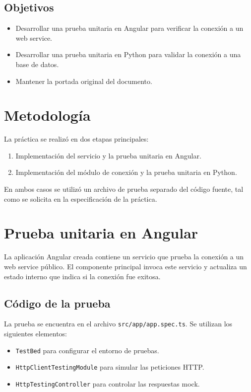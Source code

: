\documentclass[12pt]{article}
\begin{document}
\subsection{Objetivos}
\begin{itemize}
    \item Desarrollar una prueba unitaria en Angular para verificar la conexión a un web service.
    \item Desarrollar una prueba unitaria en Python para validar la conexión a una base de datos.
    \item Mantener la portada original del documento.
\end{itemize}

\section{Metodología}
La práctica se realizó en dos etapas principales:
\begin{enumerate}
    \item Implementación del servicio y la prueba unitaria en Angular.
    \item Implementación del módulo de conexión y la prueba unitaria en Python.
\end{enumerate}
En ambos casos se utilizó un archivo de prueba separado del código fuente, tal como se solicita en la especificación de la práctica.

\section{Prueba unitaria en Angular}
La aplicación Angular creada contiene un servicio que prueba la conexión a un web service público. El componente principal invoca este servicio y actualiza un estado interno que indica si la conexión fue exitosa.

\subsection{Código de la prueba}
La prueba se encuentra en el archivo \texttt{src/app/app.spec.ts}. Se utilizan los siguientes elementos:
\begin{itemize}
    \item \texttt{TestBed} para configurar el entorno de pruebas.
    \item \texttt{HttpClientTestingModule} para simular las peticiones HTTP.
    \item \texttt{HttpTestingController} para controlar las respuestas mock.
\end{itemize}
\end{document}
